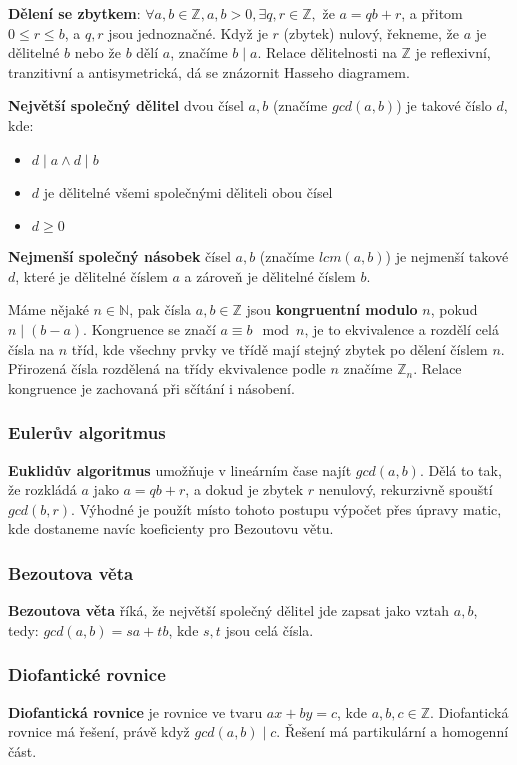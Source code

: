 \documentclass[10pt,a4paper]{article}
\begin{document}
\textbf{Dělení se zbytkem}: $\forall a, b \in \mathbb{Z}, a, b > 0, \exists q, r \in \mathbb{Z},$ že $ a = qb + r$, a přitom $0 \leq r \le b$, a $q, r$ jsou jednoznačné. Když je $r$ (zbytek) nulový, řekneme, že $a$ je dělitelné $b$ nebo že $b$ dělí $a$, značíme $b \mid a$. Relace dělitelnosti na $\mathbb{Z}$ je reflexivní, tranzitivní a antisymetrická, dá se znázornit Hasseho diagramem.

\textbf{Největší společný dělitel} dvou čísel $a, b$ (značíme $gcd(a,b)$) je takové číslo $d$, kde:
\begin{itemize}
\item $d \mid a \wedge d \mid b$
\item $d$ je dělitelné všemi společnými děliteli obou čísel
\item $d \geq 0$
\end{itemize}

\textbf{Nejmenší společný násobek} čísel $a, b$ (značíme $lcm(a, b)$) je nejmenší takové $d$, které je dělitelné číslem $a$ a zároveň je dělitelné číslem $b$.

Máme nějaké $n \in \mathbb{N}$, pak čísla $a, b \in \mathbb{Z}$ jsou \textbf{kongruentní modulo} $n$, pokud $n \mid (b-a)$. Kongruence se značí $a \equiv b\mod n$, je to ekvivalence a rozdělí celá čísla na $n$ tříd, kde všechny prvky ve třídě mají stejný zbytek po dělení číslem $n$. Přirozená čísla rozdělená na třídy ekvivalence podle $n$ značíme $\mathbb{Z}_n$. Relace kongruence je zachovaná při sčítání i násobení.

\subsubsection{Eulerův algoritmus}
\textbf{Euklidův algoritmus} umožňuje v lineárním čase najít $gcd(a,b)$. Dělá to tak, že rozkládá $a$ jako $a = qb + r$, a dokud je zbytek $r$ nenulový, rekurzivně spouští $gcd(b,r)$. Výhodné je použít místo tohoto postupu výpočet přes úpravy matic, kde dostaneme navíc koeficienty pro Bezoutovu větu.

\subsubsection{Bezoutova věta}
\textbf{Bezoutova věta} říká, že největší společný dělitel jde zapsat jako vztah $a,b$, tedy: $gcd(a, b) = sa + tb$, kde $s,t$ jsou celá čísla.

\subsubsection{Diofantické rovnice}
\textbf{Diofantická rovnice} je rovnice ve tvaru $ax + by = c$, kde $a,b,c \in \mathbb{Z}$. Diofantická rovnice má řešení, právě když $gcd(a,b) \mid c$. Řešení má partikulární a homogenní část.
\end{document}
